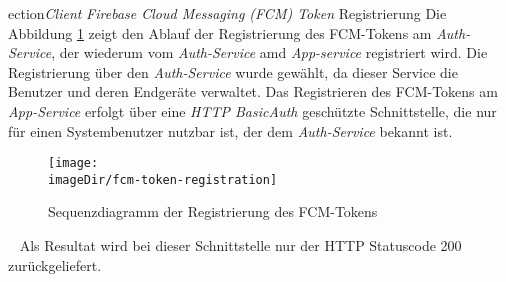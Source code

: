 \documentclass[]{article}
\newcommand{\imageDir}{../../images}
\begin{document}
{{{{\newpage
ection{\emph{Client} \emph{Firebase Cloud Messaging (FCM) Token} Registrierung}
Die Abbildung \ref{fig:image-sequence-fcm-token-registration} zeigt den Ablauf der Registrierung des FCM-Tokens am \emph{Auth-Service}, der wiederum vom \emph{Auth-Service} amd \emph{App-service} registriert wird. Die Registrierung über den \emph{Auth-Service} wurde gewählt, da dieser Service die Benutzer und deren Endgeräte verwaltet. Das Registrieren des FCM-Tokens am \emph{App-Service} erfolgt über eine \emph{HTTP BasicAuth} geschützte Schnittstelle, die nur für einen Systembenutzer nutzbar ist, der dem \emph{Auth-Service} bekannt ist. 
\begin{figure}[h]
	\centering
	\texttt{[image: \\imageDir/fcm-token-registration]}
	\caption{Sequenzdiagramm der Registrierung des FCM-Tokens}
	\label{fig:image-sequence-fcm-token-registration}
\end{figure}
\ \newline                        
Als Resultat wird bei dieser Schnittstelle nur der HTTP Statuscode 200 zurückgeliefert.

}}}}
\end{document}
